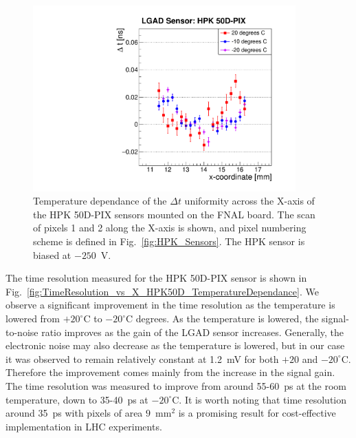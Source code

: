 \documentclass[preprint,1p]{elsarticle}
\begin{document}
\begin{figure}[htbp] 
\centering
\includegraphics[width=0.9\textwidth]{figs/FNAL_MeanTime_vs_X_HPK50D_TemperatureDependance.pdf} 
\caption{Temperature dependance of the $\Delta t$ uniformity across
the X-axis of the HPK 50D-PIX sensors mounted on the FNAL board. The scan of
pixels 1 and 2 along the X-axis is shown, and pixel numbering scheme is defined
in Fig.~\ref{fig:HPK_Sensors}. The HPK sensor is biased at $-250$~V.} 
\label{fig:MeanTime_vs_X_HPK50D_TemperatureDependance} 
\end{figure} 

The time resolution measured for the HPK 50D-PIX sensor is shown in
Fig.~\ref{fig:TimeResolution_vs_X_HPK50D_TemperatureDependance}. We observe a
significant improvement in the time resolution as the temperature is lowered
from $+20^{\circ}$C to $-20^{\circ}$C degrees. As the temperature is lowered,
the signal-to-noise ratio improves as the gain of the LGAD sensor increases.
Generally, the electronic noise may also decrease as the temperature is lowered,
but in our case it was observed to remain relatively constant at 1.2~mV for both
$+20$ and $-20^{\circ}$C. Therefore the improvement comes mainly from the
increase in the signal gain. The time resolution was measured to improve from
around 55-60~ps at the room temperature, down to 35-40~ps at $-20^{\circ}$C. It
is worth noting that time resolution around 35~ps with pixels of area
$9$~$\mathrm{mm}^{2}$ is a promising result for cost-effective implementation in
LHC experiments.
\end{document}
